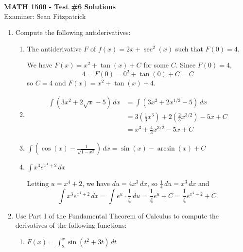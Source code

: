 \documentclass[12pt]{article}
\newcommand{\points}[1]{\marginpar{\hspace{24pt}[#1]}}
\newcommand{\di}{\displaystyle}
\begin{document}
\begin{center}
{\bf MATH 1560 - Test \#6 Solutions}\\
Examiner: Sean Fitzpatrick
\end{center}

 \begin{enumerate}
 \item  Compute the following antiderivatives:
 \begin{enumerate}
 \item The antiderivative $F$ of $f(x) = 2x+\sec^2(x)$ such that $F(0)=4$. \points{3}
 
\medskip

We have $F(x)=x^2+\tan(x)+C$ for some $C$. Since $F(0)=4$,
\[
4 = F(0) = 0^2+\tan(0)+C = C
\]
so $C=4$ and $F(x) = x^2+\tan(x)+4$.

\bigskip
 
 \item  \points{3} \begin{align*}
 \int (3x^2+2\sqrt{x}-5)\,dx &= \int(3x^2+2x^{1/2}-5)\,dx\\
&= 3\left(\frac{1}{3}x^3\right)+2\left(\frac{2}{3}x^{3/2}\right)-5x+C\\
& = x^3+\frac{4}{3}x^{3/2}-5x+C
 \end{align*} 
 
\medskip





 
 \item $\di \int \left(\cos(x)-\frac{1}{\sqrt{1-x^2}}\right)\,dx = \sin(x)-\arcsin(x)+C$ \points{3}
 
 \bigskip
 
 \item $\di \int x^3 e^{x^4+2}\,dx$ \points{3}
 
 \medskip
 
 Letting $u=x^4+2$, we have $du = 4x^3\,dx$, so $\frac{1}{4}\,du = x^3\,dx$ and
 \[
 \int x^3 e^{x^4+2}\,dx = \int e^u\cdot \frac{1}{4}\,du = \frac{1}{4}e^u+C = \frac{1}{4}e^{x^4+2}+C.
 \]
 \end{enumerate}
 \newpage
 
 \item Use Part I of the Fundamental Theorem of Calculus to compute the derivatives of the following functions:
 \begin{enumerate}
 \item $\di F(x) = \int_2^x \sin(t^2+3t)\,dt$ \points{2}
 
 \medskip
 

\end{enumerate}
\end{enumerate}
\end{document}
